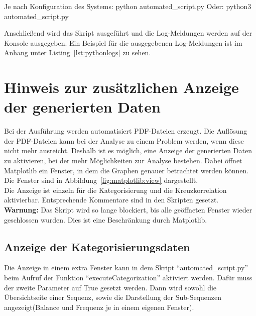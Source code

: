 {}{}

\begin{ExecuteCommandLinux}
Je nach Konfiguration des Systems:
	python automated_script.py
Oder:
	python3 automated_script.py
\end{ExecuteCommandLinux}

Anschließend wird das Skript ausgeführt und die Log-Meldungen werden auf der Konsole ausgegeben.
Ein Beispiel für die ausgegebenen Log-Meldungen ist im Anhang unter Listing~\ref{lst:pythonlogs} zu sehen.

\section{Hinweis zur zusätzlichen Anzeige der generierten Daten}
Bei der Ausführung werden automatisiert PDF-Dateien erzeugt.
Die Auflösung der PDF-Dateien kann bei der Analyse zu einem Problem werden, wenn diese nicht mehr ausreicht.
Deshalb ist es möglich, eine Anzeige der generierten Daten zu aktivieren, bei der mehr Möglichkeiten zur Analyse bestehen.
Dabei öffnet Matplotlib ein Fenster, in dem die Graphen genauer betrachtet werden können.
Die Fenster sind in Abbildung~\ref{fig:matplotlib:view} dargestellt.\\
Die Anzeige ist einzeln für die Kategorisierung und die Kreuzkorrelation aktivierbar.
Entsprechende Kommentare sind in den Skripten gesetzt.
\\
\textbf{Warnung:} Das Skript wird so lange blockiert, bis alle geöffneten Fenster wieder geschlossen wurden.
Dies ist eine Beschränkung durch Matplotlib.

\subsection{Anzeige der Kategorisierungsdaten} Die Anzeige in einem extra Fenster kann in dem Skript \enquote{automated\_script.py} beim Aufruf der Funktion \enquote{executeCategorization} aktiviert werden.
Dafür muss der zweite Parameter auf True gesetzt werden.
Dann wird sowohl die Übersichtseite einer Sequenz, sowie die Darstellung der Sub-Sequenzen angezeigt(Balance und Frequenz je in einem eigenen Fenster).
	
